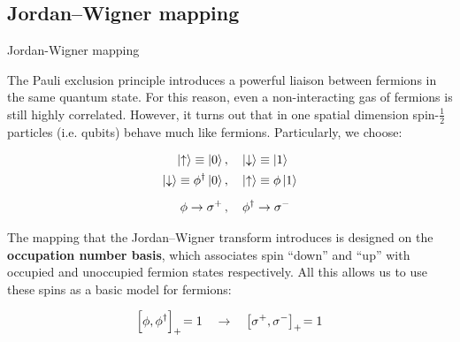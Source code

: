 \subsection{Jordan--Wigner mapping}


\begin{frame}[allowframebreaks]{Jordan-Wigner mapping}

  The Pauli exclusion principle introduces a powerful liaison between fermions in the same quantum state. For this reason, even a non-interacting gas of fermions is still highly correlated. However, it turns out that in one spatial dimension spin-$\frac{1}{2}$ particles (i.e. qubits) behave much like fermions. Particularly, we choose:

  \begin{align*}
    \ket{\uparrow} \equiv \ket{0} &\,,\quad
      \ket{\downarrow} \equiv \ket{1} \\
    \ket{\downarrow} \equiv \phi^{\dagger}\ket{0} &\,,\quad
      \ket{\uparrow} \equiv \phi\ket{1} \\[5pt]
    \phi \rightarrow \sigma^{+} &\,,\quad \phi^{\dagger} \rightarrow \sigma^{-}
  \end{align*}

  The mapping that the Jordan--Wigner transform introduces is designed on the \textbf{occupation number basis}, which associates spin ``down'' and ``up'' with occupied and unoccupied fermion states respectively. All this allows us to use these spins as a basic model for fermions:

	\begin{gather*}
	  \acom{\phi}{\phi^{\dagger}} = 1 \qra \acom{\sigma^{+}}{\sigma^{-}} = 1
	\end{gather*}

\break




\end{frame}
